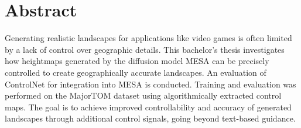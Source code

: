 \chapter{Abstract}


Generating realistic landscapes for applications like video games is often limited by a lack
of control over geographic details. This bachelor’s thesis investigates how heightmaps
generated by the diffusion model MESA can be precisely controlled to create geographically accurate landscapes. An evaluation of ControlNet
for integration into MESA is conducted. Training and evaluation was performed on
the MajorTOM dataset using algorithmically extracted control maps. The goal
is to achieve improved controllability and accuracy of generated landscapes through
additional control signals, going beyond text-based guidance.
